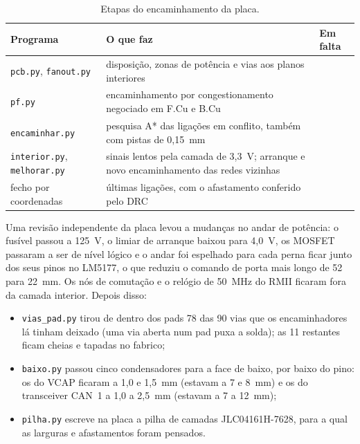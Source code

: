 \begin{table}[htbp]
\centering\small{}
\renewcommand{\arraystretch}{1.15}
\caption{Etapas do encaminhamento da placa.}
\label{tab:impl-encaminhamento}
\begin{tabularx}{\textwidth}{@{}>{\raggedright\arraybackslash}p{}>{\raggedright\arraybackslash}X>{\raggedleft\arraybackslash}p{}@{}}
\toprule
\rowcolor{LasetTint}
Programa & O que faz & Em falta \\
\midrule
\texttt{pcb.py}, \texttt{fanout.py} & disposição, zonas de potência e vias aos planos interiores & 302 \\
\texttt{pf.py} & encaminhamento por congestionamento negociado em F.Cu e B.Cu & 80 \\
\texttt{encaminhar.py} & pesquisa A* das ligações em conflito, também com pistas de 0,15~mm & 21 \\
\texttt{interior.py}, \texttt{melhorar.py} & sinais lentos pela camada de 3,3~V; arranque e novo encaminhamento das redes vizinhas & 11 \\
fecho por coordenadas & últimas ligações, com o afastamento conferido pelo DRC & 0 \\
\bottomrule
\end{tabularx}
\end{table}

Uma revisão independente da placa levou a mudanças no andar de potência: o
fusível passou a 125~V, o limiar de arranque baixou para 4,0~V, os MOSFET
passaram a ser de nível lógico e o andar foi espelhado para cada perna ficar
junto dos seus pinos no LM5177, o que reduziu o comando de porta mais longo
de 52 para 22~mm. Os nós de comutação e o relógio de 50~MHz do RMII ficaram
fora da camada interior. Depois disso:

\begin{itemize}
  \item \texttt{vias\_pad.py} tirou de dentro dos pads 78 das 90 vias que os
        encaminhadores lá tinham deixado (uma via aberta num pad puxa a
        solda); as 11 restantes ficam cheias e tapadas no fabrico;
  \item \texttt{baixo.py} passou cinco condensadores para a face de baixo, por
        baixo do pino: os do VCAP ficaram a 1,0 e 1,5~mm (estavam a 7 e 8~mm)
        e os do transceiver CAN~1 a 1,0 a 2,5~mm (estavam a 7 a 12~mm);
  \item \texttt{pilha.py} escreve na placa a pilha de camadas JLC04161H-7628,
        para a qual as larguras e afastamentos foram pensados.
\end{itemize}

